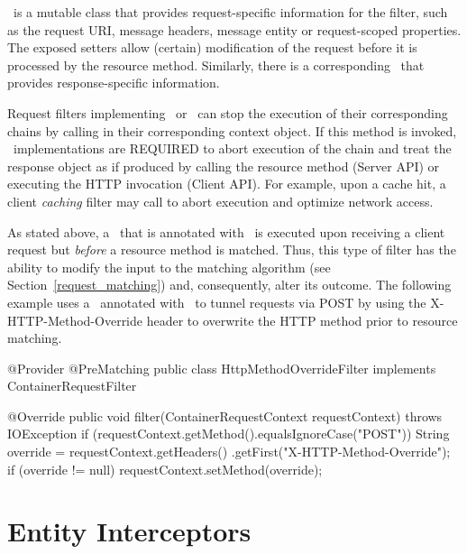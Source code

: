 \ContainerRequestContext\ is a mutable class that provides request-specific information for the filter, such as the request URI, message headers, message entity or request-scoped properties. The exposed setters allow (certain) modification of the request before it is processed by the resource method. Similarly, there is 
a corresponding \ContainerResponseContext\ that provides response-specific information.

Request filters implementing \ClientRequestFilter\ or \ContainerRequestFilter\ can stop the execution of their corresponding chains by calling  in their corresponding context object. If this method is invoked, \jaxrs\ implementations are REQUIRED to abort execution of the chain and treat the response object as if produced by calling the resource method (Server API) or executing the HTTP invocation (Client API). For example, upon a cache hit, a client {\em caching} filter may call  to abort execution and optimize network access.

As stated above, a \ContainerRequestFilter\ that is annotated with \PreMatching\ is executed upon receiving a client request but {\em before} a resource method is matched. Thus, this type of filter has the ability to modify the input to the matching algorithm (see Section~\ref{request_matching}) and, consequently, alter its outcome. 
The following example uses a \ContainerRequestFilter\ annotated with \PreMatching\ to tunnel requests via POST by using the X-HTTP-Method-Override header to overwrite the HTTP method prior to resource matching.

\begin{listing}{1}
@Provider
@PreMatching
public class HttpMethodOverrideFilter implements ContainerRequestFilter {

    @Override
    public void filter(ContainerRequestContext requestContext) 
        throws IOException {
        if (requestContext.getMethod().equalsIgnoreCase("POST")) {
            String override = requestContext.getHeaders()
                .getFirst("X-HTTP-Method-Override");
            if (override != null) {
                requestContext.setMethod(override);
            }
        }
    }
}
\end{listing}

\section{Entity Interceptors}
\label{entity_interceptors}

